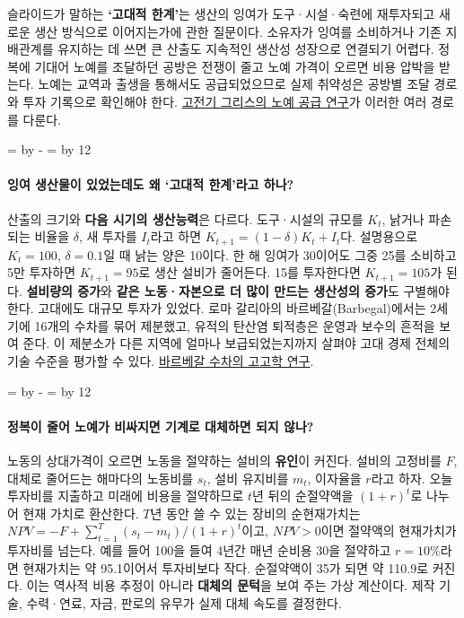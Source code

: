 \documentclass[10pt,a4paper]{article}
\newcommand{\ReserveQuestionSpace}{%
  \par\begingroup
  \dimen0=\pagegoal \advance\dimen0 by -\pagetotal
  \dimen2=\baselineskip \multiply\dimen2 by 12
  \ifdim\dimen0<\dimen2 \newpage\fi
  \endgroup}
\begin{document}
슬라이드가 말하는 \textbf{‘고대적 한계’}는 생산의 잉여가 도구·시설·숙련에 재투자되고 새로운 생산 방식으로 이어지는가에 관한 질문이다. 소유자가 잉여를 소비하거나 기존 지배관계를 유지하는 데 쓰면 큰 산출도 지속적인 생산성 성장으로 연결되기 어렵다. 정복에 기대어 노예를 조달하던 공방은 전쟁이 줄고 노예 가격이 오르면 비용 압박을 받는다. 노예는 교역과 출생을 통해서도 공급되었으므로 실제 취약성은 공방별 조달 경로와 투자 기록으로 확인해야 한다. \href{https://www.cambridge.org/core/books/abs/cambridge-world-history-of-slavery/slave-supply-in-classical-greece/AAC63973C5CD24DD378F1A72077CE05B}{고전기 그리스의 노예 공급 연구}가 이러한 여러 경로를 다룬다.\par

\ReserveQuestionSpace
\paragraph{잉여 생산물이 있었는데도 왜 ‘고대적 한계’라고 하나?}
산출의 크기와 \textbf{다음 시기의 생산능력}은 다르다. 도구·시설의 규모를 $K_t$, 낡거나 파손되는 비율을 $\delta$, 새 투자를 $I_t$라고 하면 $K_{t+1}=(1-\delta)K_t+I_t$다. 설명용으로 $K_t=100$, $\delta=0.1$일 때 낡는 양은 10이다. 한 해 잉여가 30이어도 그중 25를 소비하고 5만 투자하면 $K_{t+1}=95$로 생산 설비가 줄어든다. 15를 투자한다면 $K_{t+1}=105$가 된다. \textbf{설비량의 증가}와 \textbf{같은 노동·자본으로 더 많이 만드는 생산성의 증가}도 구별해야 한다. 고대에도 대규모 투자가 있었다. 로마 갈리아의 바르베갈(Barbegal)에서는 2세기에 16개의 수차를 묶어 제분했고, 유적의 탄산염 퇴적층은 운영과 보수의 흔적을 보여 준다. 이 제분소가 다른 지역에 얼마나 보급되었는지까지 살펴야 고대 경제 전체의 기술 수준을 평가할 수 있다. \href{https://pubmed.ncbi.nlm.nih.gov/30191173/}{바르베갈 수차의 고고학 연구}.\par

\ReserveQuestionSpace
\paragraph{정복이 줄어 노예가 비싸지면 기계로 대체하면 되지 않나?}
노동의 상대가격이 오르면 노동을 절약하는 설비의 \textbf{유인}이 커진다. 설비의 고정비를 $F$, 대체로 줄어드는 해마다의 노동비를 $s_t$, 설비 유지비를 $m_t$, 이자율을 $r$라고 하자. 오늘 투자비를 지출하고 미래에 비용을 절약하므로 $t$년 뒤의 순절약액을 $(1+r)^t$로 나누어 현재 가치로 환산한다. $T$년 동안 쓸 수 있는 장비의 순현재가치는 $NPV=-F+\sum_{t=1}^{T}(s_t-m_t)/(1+r)^t$이고, $NPV>0$이면 절약액의 현재가치가 투자비를 넘는다. 예를 들어 100을 들여 4년간 매년 순비용 30을 절약하고 $r=10\%$라면 현재가치는 약 95.1이어서 투자비보다 작다. 순절약액이 35가 되면 약 110.9로 커진다. 이는 역사적 비용 추정이 아니라 \textbf{대체의 문턱}을 보여 주는 가상 계산이다. 제작 기술, 수력·연료, 자금, 판로의 유무가 실제 대체 속도를 결정한다.\par
\end{document}
